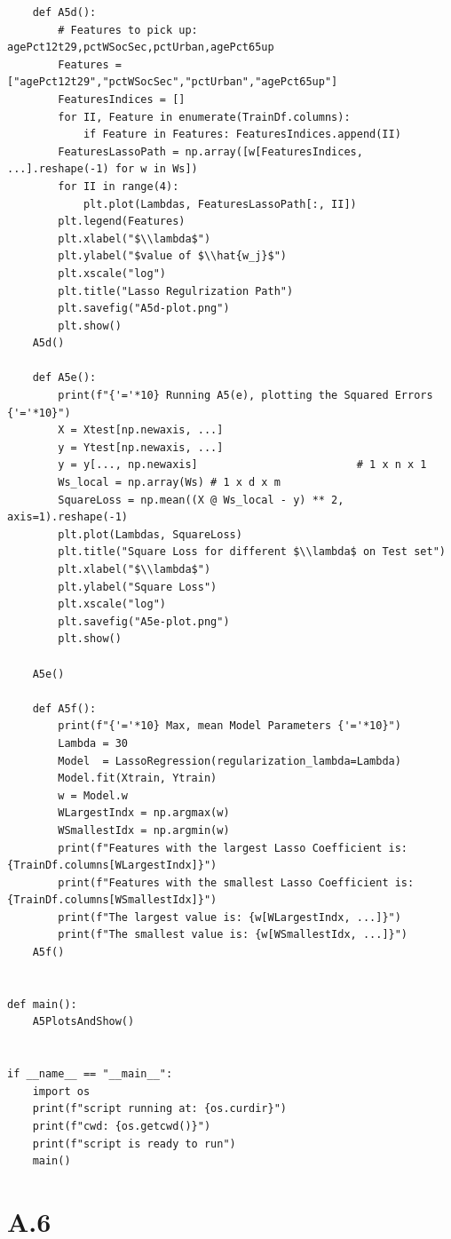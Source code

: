 \documentclass[]{article}
\begin{document}
\begin{lstlisting}
    def A5d():
        # Features to pick up: agePct12t29,pctWSocSec,pctUrban,agePct65up
        Features = ["agePct12t29","pctWSocSec","pctUrban","agePct65up"]
        FeaturesIndices = []
        for II, Feature in enumerate(TrainDf.columns):
            if Feature in Features: FeaturesIndices.append(II)
        FeaturesLassoPath = np.array([w[FeaturesIndices, ...].reshape(-1) for w in Ws])
        for II in range(4):
            plt.plot(Lambdas, FeaturesLassoPath[:, II])
        plt.legend(Features)
        plt.xlabel("$\\lambda$")
        plt.ylabel("$value of $\\hat{w_j}$")
        plt.xscale("log")
        plt.title("Lasso Regulrization Path")
        plt.savefig("A5d-plot.png")
        plt.show()
    A5d()

    def A5e():
        print(f"{'='*10} Running A5(e), plotting the Squared Errors {'='*10}")
        X = Xtest[np.newaxis, ...]
        y = Ytest[np.newaxis, ...]
        y = y[..., np.newaxis]                         # 1 x n x 1
        Ws_local = np.array(Ws) # 1 x d x m
        SquareLoss = np.mean((X @ Ws_local - y) ** 2, axis=1).reshape(-1)
        plt.plot(Lambdas, SquareLoss)
        plt.title("Square Loss for different $\\lambda$ on Test set")
        plt.xlabel("$\\lambda$")
        plt.ylabel("Square Loss")
        plt.xscale("log")
        plt.savefig("A5e-plot.png")
        plt.show()

    A5e()

    def A5f():
        print(f"{'='*10} Max, mean Model Parameters {'='*10}")
        Lambda = 30
        Model  = LassoRegression(regularization_lambda=Lambda)
        Model.fit(Xtrain, Ytrain)
        w = Model.w
        WLargestIndx = np.argmax(w)
        WSmallestIdx = np.argmin(w)
        print(f"Features with the largest Lasso Coefficient is: {TrainDf.columns[WLargestIndx]}")
        print(f"Features with the smallest Lasso Coefficient is: {TrainDf.columns[WSmallestIdx]}")
        print(f"The largest value is: {w[WLargestIndx, ...]}")
        print(f"The smallest value is: {w[WSmallestIdx, ...]}")
    A5f()


def main():
    A5PlotsAndShow()


if __name__ == "__main__":
    import os
    print(f"script running at: {os.curdir}")
    print(f"cwd: {os.getcwd()}")
    print(f"script is ready to run")
    main()
        \end{lstlisting}
        
    
        
\section*{A.6}
    
\end{document}
